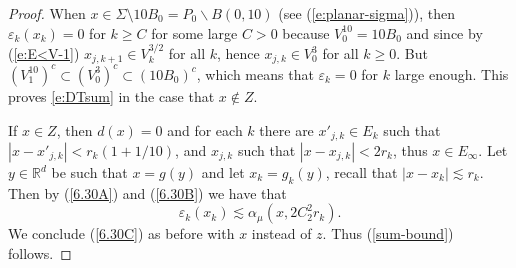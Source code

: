 \documentclass[11pt]{amsart}
\newcommand{\R}{{\mathbb R}}       %
\newcommand{\rf}[1]{{(\ref{#1})}}
\newcommand{\ve}{{\varepsilon}}
\theoremstyle{definition}
\theoremstyle{remark}
\numberwithin{equation}{section}
\def\lec{\lesssim}
\def\lec{\lesssim}
\newcommand{\jonas}[1]{}%
\begin{document}
\begin{proof}

When $x\in \Sigma\setminus 10 B_{0}=P_0\backslash B(0,10)$ (see \rf{e:planar-sigma}), then $\ve_{k}(x_{k})=0$ for $k\geq C$ for some large $C>0$ because $V_0^{10}=10B_0$ and since by \rf{e:E<V-1} $x_{j,k+1}\in V_k^{3/2}$ for all $k$, hence $x_{j,k}\in V_{0}^{3}$ for all $k\geq 0$. But  $(V_1^{10})^c\subset (V_0^3)^c\subset (10B_0)^c$, which means that $\ve_{k}=0$ for $k$ large enough. %
This proves \eqref{e:DTsum} in the case that $x\not\in Z$.

If $x\in Z$, then $d(x)=0$ and for each $k$ there are $x'_{j,k}\in E_k$ such that  $|x-x'_{j,k}|<r_k(1+1/10)$, and $x_{j,k}$ such that $|x-x_{j,k}|<2r_k$, thus $x\in E_\infty$. Let $y\in \R^d$ be such that $x=g(y)$ and let $x_k=g_k(y)$, recall that $|x-x_k|\lec r_k$. Then by \rf{6.30A} and \rf{6.30B} we have that 
\begin{equation}\label{6.30C}
\ve_k(x_k)\lec \alpha_\mu(x, 2C_2^2r_k).
\end{equation}
We conclude \rf{6.30C} as before with $x$ instead of $z$. Thus \rf{sum-bound} follows.

\end{proof}
\end{document}
